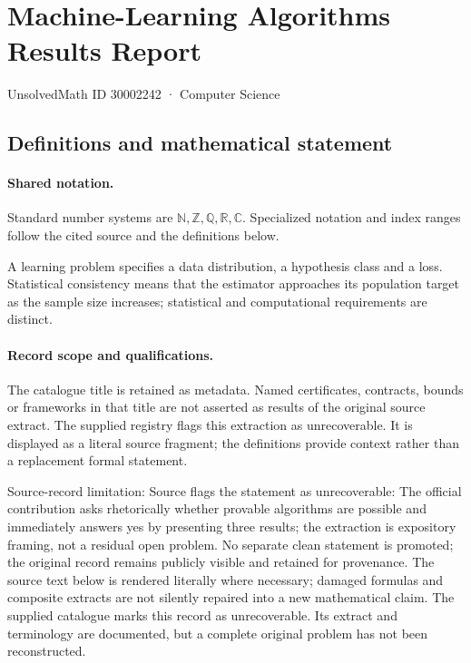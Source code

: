 \documentclass[11pt]{article}
\begin{document}
\setcounter{section}{30002241}
\section{Machine-Learning Algorithms Results Report}\label{30002242}
{\small\sffamily UnsolvedMath ID 30002242 · Computer Science}
\subsection{Definitions and mathematical statement}

\paragraph{Shared notation.}Standard number systems are $\mathbb N,\mathbb Z,\mathbb Q,\mathbb R,\mathbb C$. Specialized notation and index ranges follow the cited source and the definitions below.


A learning problem specifies a data distribution, a hypothesis class and a loss. Statistical consistency means that the estimator approaches its population target as the sample size increases; statistical and computational requirements are distinct.
\paragraph{Record scope and qualifications.}
The catalogue title is retained as metadata. Named certificates, contracts, bounds or frameworks in that title are not asserted as results of the original source extract.
The supplied registry flags this extraction as unrecoverable. It is displayed as a literal source fragment; the definitions provide context rather than a replacement formal statement.

Source-record limitation: Source flags the statement as unrecoverable: The official contribution asks rhetorically whether provable algorithms are possible and immediately answers yes by presenting three results; the extraction is expository framing, not a residual open problem. No separate clean statement is promoted; the original record remains publicly visible and retained for provenance.
The source text below is rendered literally where necessary; damaged formulas and composite extracts are not silently repaired into a new mathematical claim.
The supplied catalogue marks this record as unrecoverable. Its extract and terminology are documented, but a complete original problem has not been reconstructed.
\end{document}
